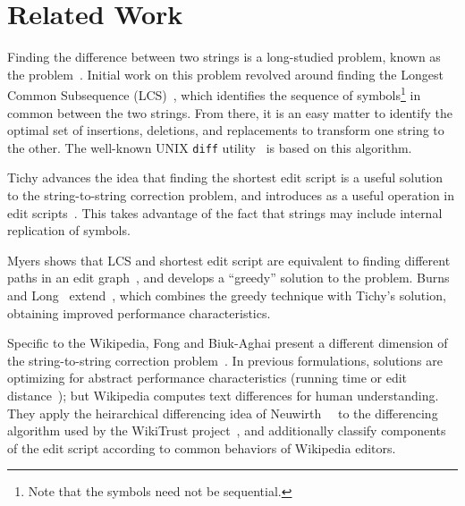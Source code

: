 \section{Related Work}
\label{sec:diff-related}

Finding the difference between two strings is a long-studied problem,
known as the  problem~\cite{Wagner1974}.
Initial work on this problem revolved around finding the
Longest Common Subsequence (LCS)~\cite{Gusfield1999}, which identifies the
sequence of symbols\footnote{Note that the symbols need not be sequential.}
in common between the two strings.
From there, it is an easy matter to identify the optimal
set of insertions, deletions, and replacements to transform
one string to the other.
The well-known UNIX \texttt{diff} utility~\cite{Hunt1976} is based
on this algorithm.

Tichy advances the idea that finding the shortest edit script is a
useful solution to the string-to-string correction problem, and
introduces  as a useful operation in edit
scripts~\cite{Tichy1984}.
This takes advantage of the fact that strings may include internal
replication of symbols.

Myers shows that LCS and shortest edit script are equivalent to finding
different paths in an edit graph~\cite{Myers1986}, and develops a
``greedy'' solution to the problem.
Burns and Long~\cite{Burns1997} extend~\cite{Reichenberger1991},
which combines the greedy technique with Tichy's solution,
obtaining improved performance characteristics.

Specific to the Wikipedia, Fong and Biuk-Aghai present a different
dimension of the string-to-string correction problem~\cite{Fong2010}.
In previous formulations, solutions are optimizing for abstract
performance characteristics (\eg running time or
edit distance~\cite{Levenshtein1966}); but Wikipedia computes text differences
for human understanding.
They apply the heirarchical differencing idea of
Neuwirth~\etal~\cite{Neuwirth1992} to the differencing algorithm used by the
WikiTrust project~\cite{www07}, and additionally classify components
of the edit script according to common behaviors of Wikipedia editors.

